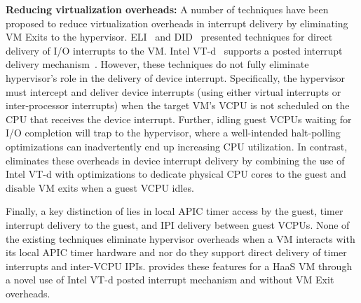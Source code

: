 {\bf Reducing virtualization overheads:}
A number of techniques have been proposed to reduce virtualization
overheads in interrupt delivery by eliminating VM Exits to the hypervisor.
ELI~\cite{amit:2015} and DID~\cite{tu:2015} presented techniques
for direct delivery of I/O interrupts to the VM. 
Intel VT-d~\cite{intelvtd-paper,intelvtd-manual} supports a posted interrupt delivery mechanism~\cite{postedinterrupt}.
However, these techniques do not fully eliminate hypervisor's role
in the delivery of device interrupt.
Specifically, the hypervisor must intercept and deliver device interrupts
(using either virtual interrupts or inter-processor interrupts)
when the target VM's VCPU is not scheduled on the CPU
that receives the device interrupt. Further, idling guest VCPUs
waiting for I/O completion will trap to the hypervisor, where a well-intended
halt-polling optimizations can inadvertently end up increasing CPU utilization.
In contrast, \na eliminates these 
overheads in device interrupt delivery by 
combining the use of Intel VT-d with optimizations to
dedicate physical CPU cores to the guest and disable VM exits when a guest VCPU idles.

Finally, a key distinction of \na lies in local APIC timer
access by the guest, timer interrupt delivery to the guest, and IPI 
delivery between guest VCPUs.
None of the existing techniques eliminate hypervisor overheads 
when a VM interacts with its local APIC timer hardware and nor do they 
support direct delivery of timer interrupts and inter-VCPU IPIs.
\na provides these features for a HaaS VM through a novel 
use of Intel VT-d posted interrupt mechanism and without 
VM Exit overheads.



